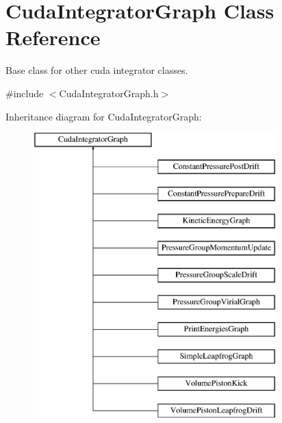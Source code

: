 \hypertarget{classCudaIntegratorGraph}{}\section{Cuda\+Integrator\+Graph Class Reference}
\label{classCudaIntegratorGraph}


Base class for other cuda integrator classes.  




{\ttfamily \#include $<$Cuda\+Integrator\+Graph.\+h$>$}

Inheritance diagram for Cuda\+Integrator\+Graph\+:\begin{figure}[H]
\begin{center}
\leavevmode
\includegraphics[height=11.000000cm]{classCudaIntegratorGraph}
\end{center}
\end{figure}
